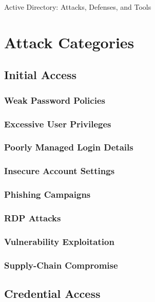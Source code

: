 Active Directory: Attacks, Defenses, and Tools

\section{Attack Categories}

\subsection{Initial Access}
\subsubsection{Weak Password Policies}
\subsubsection{Excessive User Privileges}
\subsubsection{Poorly Managed Login Details}
\subsubsection{Insecure Account Settings}
\subsubsection{Phishing Campaigns}
\subsubsection{RDP Attacks}
\subsubsection{Vulnerability Exploitation}
\subsubsection{Supply-Chain Compromise}
\subsection{Credential Access}
\subsubsection{}
\subsubsection{}

